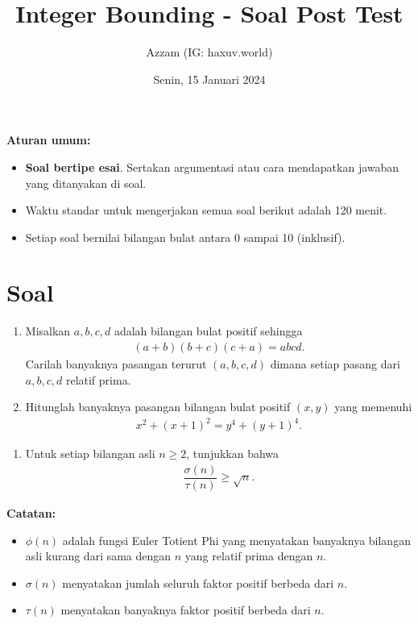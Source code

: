 \documentclass[11pt]{scrartcl}
\title{Integer Bounding - Soal Post Test}
\author{Azzam (IG: haxuv.world)}
\date{Senin, 15 Januari 2024}
\begin{document}
\maketitle
\textbf{Aturan umum:}
\begin{itemize}
    \item \textbf{Soal bertipe esai}. Sertakan argumentasi atau cara mendapatkan jawaban yang ditanyakan di soal.
    \item Waktu standar untuk mengerjakan semua soal berikut adalah 120 menit.
    \item Setiap soal bernilai bilangan bulat antara 0 sampai 10 (inklusif).
\end{itemize}

\section{Soal}
\begin{enumerate}
    \item Misalkan $a,b,c,d$ adalah bilangan bulat positif sehingga
    \begin{align*}
        (a+b)(b+c)(c+a) = abcd.
    \end{align*}
    Carilah banyaknya pasangan terurut $(a,b,c,d)$ dimana setiap pasang dari $a,b,c,d$ relatif prima.
    
    \item Hitunglah banyaknya pasangan bilangan bulat positif $(x,y)$ yang memenuhi
    \begin{align*}
        x^2+(x+1)^2 = y^4 + (y+1)^4.
    \end{align*}
\end{enumerate}

\begin{enumerate}[resume]
    \item Untuk setiap bilangan asli $n \ge 2$, tunjukkan bahwa
    \begin{align*}
        \dfrac{\sigma(n)}{\tau(n)} \ge \sqrt{n}.
    \end{align*}
\end{enumerate}

\textbf{Catatan:}
\begin{itemize}
    \item $\phi(n)$ adalah fungsi Euler Totient Phi yang menyatakan banyaknya bilangan asli kurang dari sama dengan $n$ yang relatif prima dengan $n$.
    \item $\sigma(n)$ menyatakan jumlah seluruh faktor positif berbeda dari $n$.
    \item $\tau(n)$ menyatakan banyaknya faktor positif berbeda dari $n$.
\end{itemize}
\end{document}

